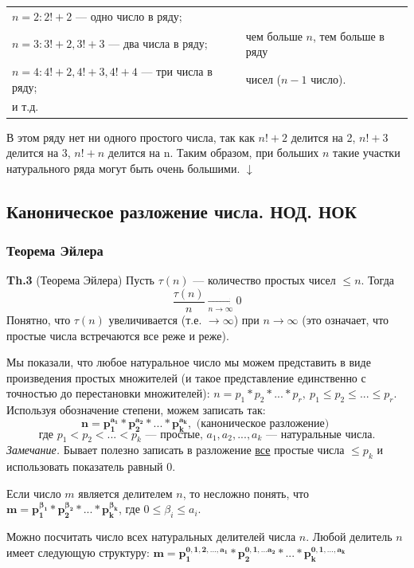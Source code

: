 \documentclass{article}
\begin{document}
  \begin{tabular}{ll}
    \( n = 2: 2! + 2 \) --- одно число в ряду; &\\
    \( n = 3: 3! + 2, 3! + 3 \) --- два числа в ряду; & чем больше \( n \), тем больше в ряду\\
    \( n = 4: 4! + 2, 4! + 3, 4! + 4 \) --- три числа в ряду; & чисел (\( n - 1 \) число).\\
    и т.д. &\\
  \end{tabular}

  В этом ряду нет ни одного простого числа, так как \( n! + 2 \) делится на 2, \( n! + 3 \) делится на 3, \( n! + n \) делится на n. Таким образом, при больших \( n \) такие участки натурального ряда могут быть очень большими. \( \downarrow \) 

  \subsection{Каноническое разложение числа. НОД. НОК}
  \subsubsection{Теорема Эйлера}
  \textbf{Th.3} (Теорема Эйлера) Пусть \( \tau(n) \) --- количество простых чисел \( \leq n \). Тогда \[ \frac{\tau(n)}{n} \xrightarrow[n \rightarrow \infty]{} 0 \]
  Понятно, что \( \tau(n) \) увеличивается (т.е. \( \rightarrow \infty \)) при \( n \rightarrow \infty \) (это означает, что простые числа встречаются все реже и реже).

  Мы показали, что любое натуральное число мы можем представить в виде произведения простых множителей (и такое представление единственно с точностью до перестановки множителей): \( n = p_1*p_2*...*p_r,\ p_1 \leq p_2 \leq ... \leq p_r \). Используя обозначение степени, можем записать так: \[ \mathbf{n = p_1^{a_1}*p_2^{a_2}*...*p_k^{a_k}}, \textrm{ (каноническое разложение) } \] 
  \[ \textrm{где } p_1 < p_2 < ... < p_k \textrm{ --- простые, } a_1, a_2, ..., a_k \textrm{ --- натуральные числа.} \]
  \textit{Замечание.} Бывает полезно записать в разложение \underline{все} простые числа \( \leq p_k \) и использовать показатель равный 0.

  Если число \( m \) является делителем \( n \), то несложно понять, что \( \mathbf{m = p_1^{\beta_1}*p_2^{\beta_2}*...*p_k^{\beta_k}} \), где \( 0 \leq \beta_i \leq a_i \).

  Можно посчитать число всех натуральных делителей числа \( n \). Любой делитель \( n \) имеет следующую структуру: \( \mathbf{m = p_1^{0,1,2,...,a_1}*p_2^{0,1,...a_2}*...*p_k^{0,1,...,a_k}} \)
\end{document}
